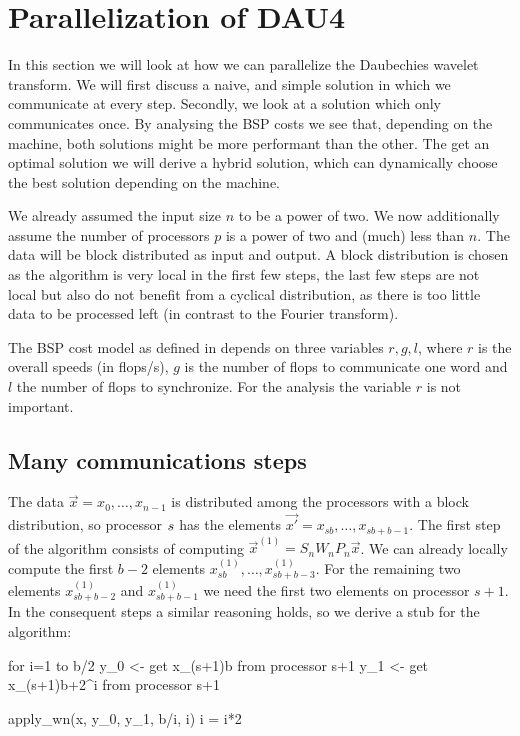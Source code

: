 
\section{Parallelization of DAU4}
\label{sec:par}

In this section we will look at how we can parallelize the Daubechies wavelet transform. We will first discuss a naive, and simple solution in which we communicate at every step. Secondly, we look at a solution which only communicates once. By analysing the BSP costs we see that, depending on the machine, both solutions might be more performant than the other. The get an optimal solution we will derive a hybrid solution, which can dynamically choose the best solution depending on the machine.

We already assumed the input size $n$ to be a power of two. We now additionally assume the number of processors $p$ is a power of two and (much) less than $n$. The data will be block distributed as input and output. A block distribution is chosen as the algorithm is very local in the first few steps, the last few steps are not local but also do not benefit from a cyclical distribution, as there is too little data to be processed left (in contrast to the Fourier transform).

The BSP cost model as defined in \cite{biss} depends on three variables $r, g, l$, where $r$ is the overall speeds (in flops/s), $g$ is the number of flops to communicate one word and $l$ the number of flops to synchronize. For the analysis the variable $r$ is not important.

\subsection{Many communications steps}
The data $\vec{x} = x_0, \ldots, x_{n-1}$ is distributed among the processors with a block distribution, so processor $s$ has the elements $\vec{x'} = x_{sb}, \ldots, x_{sb+b-1}$. The first step of the algorithm consists of computing $\vec{x}^{(1)} = S_n W_n P_n \vec{x}$. We can already locally compute the first $b-2$ elements $x^{(1)}_{sb}, \ldots, x^{(1)}_{sb+b-3}$. For the remaining two elements $x^{(1)}_{sb+b-2}$ and $x^{(1)}_{sb+b-1}$ we need the first two elements on processor $s+1$. In the consequent steps a similar reasoning holds, so we derive a stub for the algorithm:

\begin{lstlistings}
for i=1 to b/2
	y_0 <- get x_{(s+1)b} from processor s+1
	y_1 <- get x_{(s+1)b+2^i} from processor s+1

	apply_wn(x, y_0, y_1, b/i, i)
	i = i*2
\end{lstlistings}


